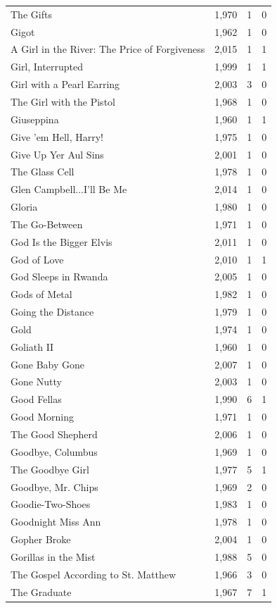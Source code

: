 \begin{tabular}{lrrr}
The Gifts & 1,970 & 1 & 0 \\
Gigot & 1,962 & 1 & 0 \\
A Girl in the River: The Price of Forgiveness & 2,015 & 1 & 1 \\
Girl, Interrupted & 1,999 & 1 & 1 \\
Girl with a Pearl Earring & 2,003 & 3 & 0 \\
The Girl with the Pistol & 1,968 & 1 & 0 \\
Giuseppina & 1,960 & 1 & 1 \\
Give 'em Hell, Harry! & 1,975 & 1 & 0 \\
Give Up Yer Aul Sins & 2,001 & 1 & 0 \\
The Glass Cell & 1,978 & 1 & 0 \\
Glen Campbell...I'll Be Me & 2,014 & 1 & 0 \\
Gloria & 1,980 & 1 & 0 \\
The Go-Between & 1,971 & 1 & 0 \\
God Is the Bigger Elvis & 2,011 & 1 & 0 \\
God of Love & 2,010 & 1 & 1 \\
God Sleeps in Rwanda & 2,005 & 1 & 0 \\
Gods of Metal & 1,982 & 1 & 0 \\
Going the Distance & 1,979 & 1 & 0 \\
Gold & 1,974 & 1 & 0 \\
Goliath II & 1,960 & 1 & 0 \\
Gone Baby Gone & 2,007 & 1 & 0 \\
Gone Nutty & 2,003 & 1 & 0 \\
Good Fellas & 1,990 & 6 & 1 \\
Good Morning & 1,971 & 1 & 0 \\
The Good Shepherd & 2,006 & 1 & 0 \\
Goodbye, Columbus & 1,969 & 1 & 0 \\
The Goodbye Girl & 1,977 & 5 & 1 \\
Goodbye, Mr. Chips & 1,969 & 2 & 0 \\
Goodie-Two-Shoes & 1,983 & 1 & 0 \\
Goodnight Miss Ann & 1,978 & 1 & 0 \\
Gopher Broke & 2,004 & 1 & 0 \\
Gorillas in the Mist & 1,988 & 5 & 0 \\
The Gospel According to St. Matthew & 1,966 & 3 & 0 \\
The Graduate & 1,967 & 7 & 1 \\

\end{tabular}
